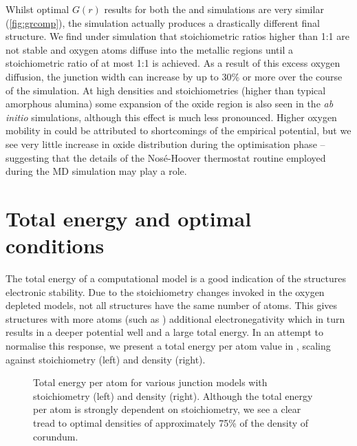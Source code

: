 Whilst optimal $G(r)$ results for both the  and  simulations are very similar (\cref{fig:grcomp}), the  simulation actually produces a drastically different final structure.
We find under  simulation that stoichiometric ratios higher than 1:1 are not stable and oxygen atoms diffuse into the metallic regions until a stoichiometric ratio of at most 1:1 is achieved.
As a result of this excess oxygen diffusion, the junction width can increase by up to 30\% or more over the course of the simulation.
At high densities and stoichiometries (higher than typical amorphous alumina) some expansion of the oxide region is also seen in the \textit{ab initio} simulations, although this effect is much less pronounced.
Higher oxygen mobility in  could be attributed to shortcomings of the empirical potential, but we see very little increase in oxide distribution during the optimisation phase -- suggesting that the details of the Nos\'{e}-Hoover thermostat routine employed during the MD simulation may play a role.

\section{Total energy and optimal conditions}
The total energy of a computational model is a good indication of the structures electronic stability.
Due to the stoichiometry changes invoked in the oxygen depleted models, not all structures have the same number of atoms.
This gives structures with more atoms (such as ) additional electronegativity which in turn results in a deeper potential well and a large total energy.
In an attempt to normalise this response, we present a total energy per atom value in , scaling against stoichiometry (left) and density (right).

\begin{figure}[htp]
\widefiguremargins
\begin{adjustwidth}{\leftwidth}{\rightwidth}
\resizebox{\widefigure}{!}{}
\caption[Energy Comparisons]{\label{fig:energyperatom}Total energy per atom for various junction models with stoichiometry (left) and density (right).  Although the total energy per atom is strongly dependent on stoichiometry, we see a clear tread to optimal densities of approximately 75\% of the density of corundum.}
\end{adjustwidth}
\end{figure}

